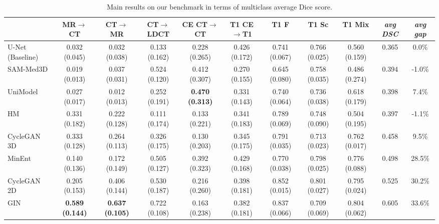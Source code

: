 
\begin{landscape}
\begin{table}[h]
	\centering
	\caption{Main results on our benchmark in terms of multiclass average Dice score.}
	\label{tab:metrics_pure}
		\begin{tabular}{lcccccccccc}
			\toprule
			& MR$\rightarrow$CT & CT$\rightarrow$MR & CT$\rightarrow$LDCT & CE CT$\rightarrow$CT & T1 CE$\rightarrow$T1 & T1 F & T1 Sc & T1 Mix & \textit{avg DSC} & \textit{avg gap} \\
			
			\midrule
			
			U-Net (Baseline)      & 0.032 (0.045) & 0.032 (0.038) & 0.133 (0.162) & 0.228 (0.265) & 0.426 (0.172) & 0.741 (0.067) & 0.766 (0.025) & 0.560 (0.159) & 0.365 & 0.0\% \\
			
			SAM-Med3D \cite{sammed} & 0.019 (0.013) & 0.037 (0.031) & 0.524 (0.120) & 0.412 (0.307) & 0.270 (0.155) & 0.645 (0.080) & 0.758 (0.035) & 0.486 (0.274) & 0.394 & -1.0\% \\
			
			
			UniModel \cite{unimodel} & 0.027 (0.017) & 0.012 (0.013) & 0.252 (0.191) & \textbf{0.470 (0.313)} & 0.331 (0.143) & 0.740 (0.064) & 0.736 (0.038) & 0.618 (0.179) & 0.398 & 7.4\%\\
			
			\midrule
			
			HM & 0.331 (0.182) & 0.222 (0.128) & 0.111 (0.174) & 0.133 (0.221) & 0.341 (0.183) & 0.789 (0.069) & 0.748 (0.090) & 0.504 (0.195) & 0.397 & -1.1\% \\
			
			CycleGAN 3D \cite{cyclegan3d} & 0.333 (0.128) & 0.264 (0.113) & 0.326 (0.175) & 0.130 (0.203) & 0.345 (0.175) & 0.791 (0.035) & 0.713 (0.023) & 0.762 (0.017) & 0.458 & 9.5\% \\
			
			MinEnt \cite{entropy} & 0.140 (0.136) & 0.172 (0.149) & 0.505 (0.127) & 0.392 (0.323) & 0.429 (0.168) & 0.770 (0.038) & 0.798 (0.025) & 0.776 (0.088) & 0.498 & 28.5\% \\
			
			CycleGAN 2D \cite{cyclegan} & 0.205 (0.153) & 0.406 (0.144) & 0.530 (0.187) & 0.216 (0.260) & 0.398 (0.181) & 0.852 (0.015) & 0.801 (0.027) & 0.795 (0.024) & 0.525 & 30.2\% \\
			
			GIN \cite{gin} & \textbf{0.589 (0.144)} & \textbf{0.637 (0.105)} & 0.722 (0.108) & 0.163 (0.238) & 0.382 (0.181) & 0.837 (0.066) & 0.709 (0.069) & 0.804 (0.062) & 0.605 & 33.6\% \\
			

\end{tabular}
\end{table}
\end{landscape}
